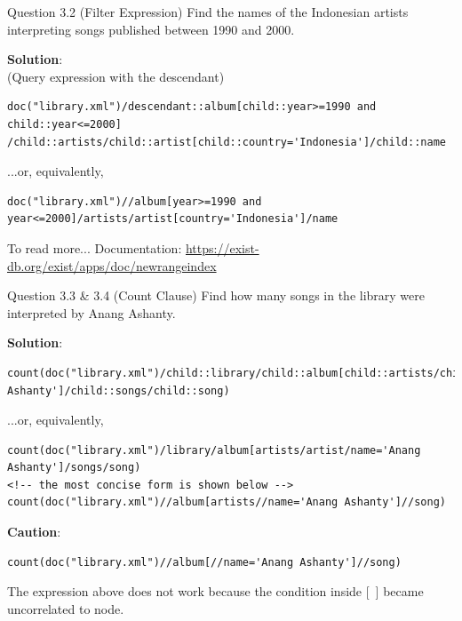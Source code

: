 \begin{frame}[fragile]{Question 3.2 (Filter Expression)}
Find the names of the Indonesian artists interpreting songs published between 1990 and 2000.

\textbf{Solution}: \\
(Query expression with the descendant)
\begin{lstlisting}[style=xml-small-nomargin]
doc("library.xml")/descendant::album[child::year>=1990 and child::year<=2000]
/child::artists/child::artist[child::country='Indonesia']/child::name
\end{lstlisting}\vspace{5pt}
...or, equivalently,
\begin{lstlisting}[style=xml-small-nomargin]
doc("library.xml")//album[year>=1990 and year<=2000]/artists/artist[country='Indonesia']/name
\end{lstlisting}\vspace{5pt}

\begin{block}{To read more...}
	Documentation: \url{https://exist-db.org/exist/apps/doc/newrangeindex}
\end{block}
\end{frame}

\begin{frame}[fragile]{Question 3.3 \& 3.4 (Count Clause)}
Find how many songs in the library were interpreted by Anang Ashanty.\\\vspace{5pt}
	
\textbf{Solution}: \\
\begin{lstlisting}[style=xml-small-nomargin]
count(doc("library.xml")/child::library/child::album[child::artists/child::artist/child::name='Anang Ashanty']/child::songs/child::song)
\end{lstlisting}\vspace{5pt}
...or, equivalently,
\begin{lstlisting}[style=xml-small-nomargin]
count(doc("library.xml")/library/album[artists/artist/name='Anang Ashanty']/songs/song)
<!-- the most concise form is shown below -->
count(doc("library.xml")//album[artists//name='Anang Ashanty']//song)
\end{lstlisting}\vspace{5pt}

\textbf{Caution}:
\begin{lstlisting}[style=xml-small-nomargin]
count(doc("library.xml")//album[//name='Anang Ashanty']//song)
\end{lstlisting}
The expression above does not work because the condition inside [\ ] became uncorrelated to node.

\end{frame}

